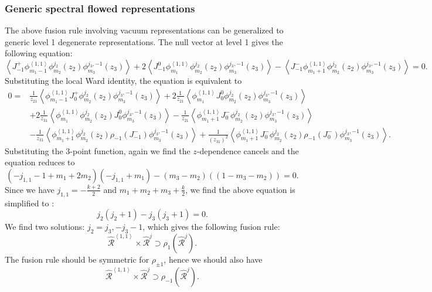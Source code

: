 \documentclass[10pt,a4paper]{article}
\numberwithin{equation}{section}
\newcommand{\vev}[1]{\left\langle #1 \right\rangle}
\begin{document}
\subsubsection*{Generic spectral flowed representations}
The above fusion rule involving vacuum representations can be generalized to generic level 1 degenerate representations. 
The null vector at level 1 gives the following equation:
\begin{equation}
    \vev{J^{+}_{-1} \phi^{\vev{1,1}}_{m_{1}-1} \phi^{j_{2}}_{m_{2}}(z_{2}) \phi^{j_{3},-1}_{m_{3}}(z_{3})} 
    + 2\vev{J^{0}_{-1} \phi^{\vev{1,1}}_{m_{1}} \phi^{j_{2}}_{m_{2}}(z_{2}) \phi^{j_{3},-1}_{m_{3}}(z_{3})} 
    - \vev{J^{-}_{-1} \phi^{\vev{1,1}}_{m_{1}+1} \phi^{j_{2}}_{m_{2}}(z_{2}) \phi^{j_{3},-1}_{m_{3}}(z_{3})} = 0.
\end{equation}
Substituting the local Ward identity, the equation is equivalent to 
\begin{equation}
    \begin{aligned}
        0 = & \frac{1}{z_{21}}\vev{ \phi^{\vev{1,1}}_{m_{1}-1} J^{+}_{0} \phi^{j_{2}}_{m_{2}}(z_{2}) \phi^{j_{3},-1}_{m_{3}}(z_{3})}  
        +2\frac{1}{z_{21}}\vev{\phi^{\vev{1,1}}_{m_{1}} J^{0}_{0}\phi^{j_{2}}_{m_{2}}(z_{2}) \phi^{j_{3},-1}_{m_{3}}(z_{3})} \\
        & +2\frac{1}{z_{31}}\vev{\phi^{\vev{1,1}}_{m_{1}} \phi^{j_{2}}_{m_{2}}(z_{2}) J^{0}_{0}\phi^{j_{3},-1}_{m_{3}}(z_{3})} 
        -\frac{1}{z_{21}}\vev{\phi^{\vev{1,1}}_{m_{1}+1} J^{-}_{0}\phi^{j_{2}}_{m_{2}}(z_{2}) \phi^{j_{3},-1}_{m_{3}}(z_{3})}\\ 
        & - \frac{1}{z_{31}}\vev{\phi^{\vev{1,1}}_{m_{1}+1} \phi^{j_{2}}_{m_{2}}(z_{2}) \rho_{-1}\left(J^{-}_{-1}\right)\phi^{j_{3},-1}_{m_{3}}(z_{3})} 
        +\frac{1}{(z_{31})^{2}}\vev{\phi^{\vev{1,1}}_{m_{1}+1} J^{-}_{0}\phi^{j_{2}}_{m_{2}}(z_{2}) \rho_{-1}\left(J^{-}_{0}\right)\phi^{j_{3},-1}_{m_{3}}(z_{3})} .
    \end{aligned}
\end{equation}
Substituting the 3-point function, again we find the $z$-dependence cancels and the equation reduces to 
\begin{equation}
    (-j_{1,1}-1+m_{1}+2m_{2})(-j_{1,1}+m_{1}) - (m_{3}-m_{2})((1-m_{3}-m_{2})) = 0.
\end{equation}
Since we have $j_{1,1} = -\frac{k+2}{2}$ and $m_{1}+m_{2}+m_{3}+\frac{k}{2}$, we find the above equation is simplified to :
\begin{equation}
    j_{2}(j_{2}+1) - j_{3}(j_{3}+1) = 0.
\end{equation}
We find two solutions: $j_{2} = j_{3},-j_{3}-1$, which gives the following fusion rule:
\begin{equation}
    \widehat{\mathcal{R}}^{\vev{1,1}} \times \widehat{\mathcal{R}}^{j} \supset \rho_{1} \left( \widehat{\mathcal{R}}^{j} \right).
\end{equation}
The fusion rule should be symmetric for $\rho_{\pm 1}$, hence we should also have 
\begin{equation}
    \widehat{\mathcal{R}}^{\vev{1,1}} \times \widehat{\mathcal{R}}^{j} \supset \rho_{-1} \left( \widehat{\mathcal{R}}^{j} \right).
\end{equation}
\end{document}
